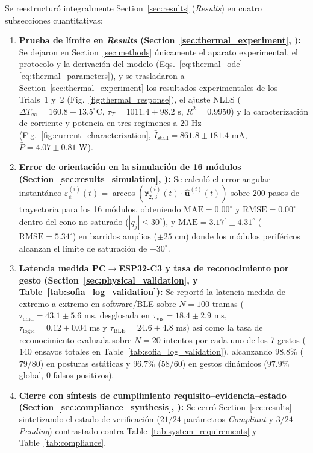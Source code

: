 \documentclass{LabDSTresponse}
\begin{document}
{Se reestructuró integralmente Section~\ref{sec:results} (\textit{Results}) en cuatro subsecciones cuantitativas:
\begin{enumerate}
    \item \textbf{Prueba de límite en \textit{Results} (Section~\ref{sec:thermal_experiment}, ):} Se dejaron en Section~\ref{sec:methods} únicamente el aparato experimental, el protocolo y la derivación del modelo (Eqs.~\eqref{eq:thermal_ode}--\eqref{eq:thermal_parameters}), y se trasladaron a Section~\ref{sec:thermal_experiment} los resultados experimentales de los Trials~1 y~2 (Fig.~\ref{fig:thermal_response}), el ajuste NLLS ($\Delta T_\infty = 160.8 \pm 13.5^\circ\text{C}$, $\tau_T = 1011.4 \pm 98.2\text{ s}$, $R^2 = 0.9950$) y la caracterización de corriente y potencia en tres regímenes a $20\text{ Hz}$ (Fig.~\ref{fig:current_characterization}, $\bar{I}_{\text{stall}} = 861.8 \pm 181.4\text{ mA}$, $\bar{P} = 4.07 \pm 0.81\text{ W}$).
    \item \textbf{Error de orientación en la simulación de 16 módulos (Section~\ref{sec:results_simulation}, ):} Se calculó el error angular instantáneo $\varepsilon_\psi^{(i)}(t) = \arccos(\hat{\mathbf{r}}_{2,3}^{(i)}(t) \cdot \hat{\mathbf{u}}^{(i)}(t))$ sobre $200$ pasos de trayectoria para los 16 módulos, obteniendo $\text{MAE} = 0.00^\circ$ y $\text{RMSE} = 0.00^\circ$ dentro del cono no saturado ($|q_j| \le 30^\circ$), y $\text{MAE} = 3.17^\circ \pm 4.31^\circ$ ($\text{RMSE} = 5.34^\circ$) en barridos amplios ($\pm 25\text{ cm}$) donde los módulos periféricos alcanzan el límite de saturación de $\pm 30^\circ$.
    \item \textbf{Latencia medida PC$\to$ESP32-C3 y tasa de reconocimiento por gesto (Section~\ref{sec:physical_validation},  y Table~\ref{tab:sofia_log_validation}):} Se reportó la latencia medida de extremo a extremo en software/BLE sobre $N = 100$ tramas ($\tau_{\text{cmd}} = 43.1 \pm 5.6\text{ ms}$, desglosada en $\tau_{\text{vis}} = 18.4 \pm 2.9\text{ ms}$, $\tau_{\text{logic}} = 0.12 \pm 0.04\text{ ms}$ y $\tau_{\text{BLE}} = 24.6 \pm 4.8\text{ ms}$) así como la tasa de reconocimiento evaluada sobre $N = 20$ intentos por cada uno de los 7 gestos ($140$ ensayos totales en Table~\ref{tab:sofia_log_validation}), alcanzando $98.8\%$ ($79/80$) en posturas estáticas y $96.7\%$ ($58/60$) en gestos dinámicos ($97.9\%$ global, $0$ falsos positivos).
    \item \textbf{Cierre con síntesis de cumplimiento requisito--evidencia--estado (Section~\ref{sec:compliance_synthesis}, ):} Se cerró Section~\ref{sec:results} sintetizando el estado de verificación ($21/24$ parámetros \textit{Compliant} y $3/24$ \textit{Pending}) contrastado contra Table~\ref{tab:system_requirements} y Table~\ref{tab:compliance}.
\end{enumerate}}
\end{document}
